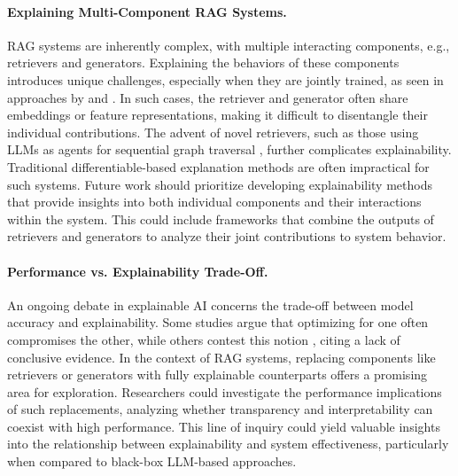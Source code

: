 \paragraph{Explaining Multi-Component RAG Systems.} RAG systems are inherently complex, with multiple interacting components, e.g., retrievers and generators. Explaining the behaviors of these components introduces unique challenges, especially when they are jointly trained, as seen in approaches by \cite{fan2024survey} and \cite{lewis2020retrieval}. In such cases, the retriever and generator often share embeddings or feature representations, making it difficult to disentangle their individual contributions. The advent of novel retrievers, such as those using LLMs as agents for sequential graph traversal \cite{jin2024graph, wang2024knowledge}, further complicates explainability. Traditional differentiable-based explanation methods are often impractical for such systems. Future work should prioritize developing explainability methods that provide insights into both individual components and their interactions within the system. This could include frameworks that combine the outputs of retrievers and generators to analyze their joint contributions to system behavior.

\paragraph{Performance vs. Explainability Trade-Off.} An ongoing debate in explainable AI concerns the trade-off between model accuracy and explainability. Some studies \cite{crook2023revisiting, arrieta2020explainable} argue that optimizing for one often compromises the other, while others contest this notion \cite{bell2022notthatsimple, rudin2022interpretable}, citing a lack of conclusive evidence. In the context of RAG systems, replacing components like retrievers or generators with fully explainable counterparts offers a promising area for exploration. Researchers could investigate the performance implications of such replacements, analyzing whether transparency and interpretability can coexist with high performance. This line of inquiry could yield valuable insights into the relationship between explainability and system effectiveness, particularly when compared to black-box LLM-based approaches.

